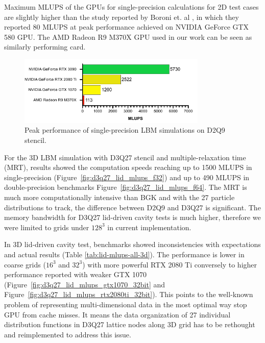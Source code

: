 Maximum MLUPS of the GPUs for single-precision calculations for 2D test cases are slightly higher than the study reported by Boroni et. al \cite{boroniFULLGPUImplementation2017}, in which they reported 80 MLUPS at peak performance achieved on NVIDIA GeForce GTX 580 GPU. The AMD Radeon R9 M370X GPU used in our work can be seen as similarly performing card. 

\begin{figure}[!ht]
	\centering
	\includegraphics[width=0.8\textwidth]{data/max_mlups_2d.pdf}
	\caption{Peak performance of single-precision LBM simulations on D2Q9 stencil.}
	\label{fig:max_mlups}
\end{figure}

For the 3D LBM simulation with D3Q27 stencil and multiple-relaxation time (MRT), results showed the computation speeds reaching up to 1500 MLUPS in single-precision (Figure~\ref{fig:d3q27_lid_mlups_f32}) and up to 490 MLUPS in double-precision benchmarks Figure~\ref{fig:d3q27_lid_mlups_f64}. The MRT is much more computationally intensive than BGK and with the 27 particle distributions to track, the difference between D2Q9 and D3Q27 is significant. The memory bandwidth for D3Q27 lid-driven cavity tests is much higher, therefore we were limited to grids under $128^3$ in current implementation.

In 3D lid-driven cavity test, benchmarks showed inconsistencies with expectations and actual results (Table \ref{tab:lid-mlups-all-3d}). The performance is lower in coarse grids ($16^3$ and $32^3$) with more powerful RTX 2080 Ti conversely to higher performance reported with weaker GTX 1070 (Figure~\ref{fig:d3q27_lid_mlups_gtx1070_32bit} and Figure~\ref{fig:d3q27_lid_mlups_rtx2080ti_32bit}). This points to the well-known problem of representing multi-dimensional data in the most optimal way stop GPU from cache misses. It means the data organization of 27 individual distribution functions in D3Q27 lattice nodes along 3D grid has to be rethought and reimplemented to address this issue.  

